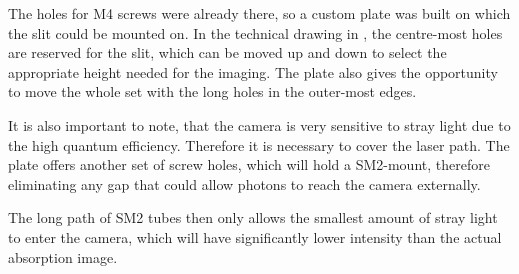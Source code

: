 The holes for M4 screws were already there, so a custom plate was built on which the slit could be mounted on.
In the technical drawing in , the centre-most holes are reserved for the slit, which can be moved up and down to select the appropriate height needed for the imaging.
The plate also gives the opportunity to move the whole set with the long holes in the outer-most edges.

It is also important to note, that the camera is very sensitive to stray light due to the high quantum efficiency. Therefore it is necessary to cover the laser path. The plate offers another set of screw holes, which will hold a SM2-mount, therefore eliminating any gap that could allow photons to reach the camera externally.

The long path of SM2 tubes then only allows the smallest amount of stray light to enter the camera, which will have significantly lower intensity than the actual absorption image.